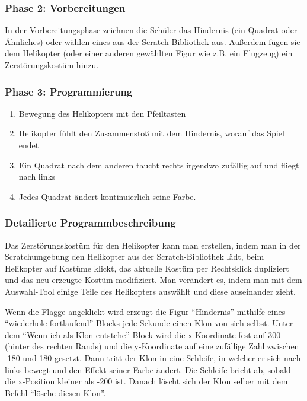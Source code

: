 \subsubsection{Phase 2: Vorbereitungen}\label{phase-2-vorbereitungen}

In der Vorbereitungsphase zeichnen die Schüler das Hindernis (ein
Quadrat oder Ähnliches) oder wählen eines aus der Scratch-Bibliothek
aus. Außerdem fügen sie dem Helikopter (oder einer anderen gewählten
Figur wie z.B. ein Flugzeug) ein Zerstörungskostüm hinzu.

\subsubsection{Phase 3: Programmierung}\label{phase-3-programmierung}

\begin{enumerate}
\item
  Bewegung des Helikopters mit den Pfeiltasten
\item
  Helikopter fühlt den Zusammenstoß mit dem Hindernis, worauf das Spiel
  endet
\item
  Ein Quadrat nach dem anderen taucht rechts irgendwo zufällig auf und
  fliegt nach links
\item
  Jedes Quadrat ändert kontinuierlich seine Farbe.
\end{enumerate}

\subsubsection{Detailierte
Programmbeschreibung}\label{detailierte-programmbeschreibung}

Das Zerstörungskostüm für den Helikopter kann man erstellen, indem man
in der Scratchumgebung den Helikopter aus der Scratch-Bibliothek lädt,
beim Helikopter auf Kostüme klickt, das aktuelle Kostüm per Rechtsklick
dupliziert und das neu erzeugte Kostüm modifiziert. Man verändert es,
indem man mit dem Auswahl-Tool einige Teile des Helikopters auswählt und
diese auseinander zieht.

Wenn die Flagge angeklickt wird erzeugt die Figur ``Hindernis'' mithilfe
eines ``wiederhole fortlaufend''-Blocks jede Sekunde einen Klon von sich
selbst. Unter dem ``Wenn ich als Klon entstehe''-Block wird die
x-Koordinate fest auf 300 (hinter des rechten Rands) und die
y-Koordinate auf eine zufällige Zahl zwischen -180 und 180 gesetzt. Dann
tritt der Klon in eine Schleife, in welcher er sich nach links bewegt
und den Effekt seiner Farbe ändert. Die Schleife bricht ab, sobald die
x-Position kleiner als -200 ist. Danach löscht sich der Klon selber mit
dem Befehl ``lösche diesen Klon''.

